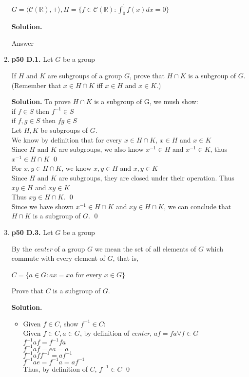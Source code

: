 \documentclass[11pt]{article}
\begin{document}
\begin{enumerate}
  $G = \langle \mathscr{C}(\mathbb{R}),+\rangle, H = \{f \in \mathscr{C}(\mathbb{R}) : \int_{0}^{1} f(x) dx = 0\}$
  
  {\bfseries Solution.}
  
  Answer \\
 
\newpage
 
\item {\bfseries p50 D.1.} Let $G$ be a group
  
  If $H$ and $K$ are subgroups of a group $G$, prove that $H \cap K$ is a subgroup of $G$. (Remember that $x \in H \cap K$ iff $x \in H$ and $x \in K$.)
  
  {\bfseries Solution.} To prove $H \cap K$ is a subgroup of G, we mush show: \\
  if $f \in S$ then $f^{-1} \in S$ \\
  if $f,g \in S$ then $fg \in S$ \\
  
  Let $H, K$ be subgroups of $G$. \\
  We know by definition that for every $x \in H \cap K$, $x \in H$ and $x \in K$ \\
  Since $H$ and $K$ are subgroups, we also know $x^{-1} \in H$ and $x^{-1} \in K$, thus $x^{-1} \in H \cap K$ \qed \\
  
  For $x,y \in H \cap K$, we know $x,y \in H$ and $x,y \in K$ \\
  Since $H$ and $K$ are subgroups, they are closed under their operation. Thus $xy \in H$ and $xy \in K$ \\
  Thus $xy \in H \cap K$. \qed \\
  
  Since we have shown $x^{-1} \in H \cap K$ and $xy \in H \cap K$, we can conclude that $H \cap K$ is a subgroup of $G$. \qed \\

\item {\bfseries p50 D.3.} Let $G$ be a group
  
  By the \textit{center} of a group $G$ we mean the set of all elements of $G$ which commute with every element of $G$, that is,
  
  $C = \{ a \in G : ax = xa$ for every $x \in G\}$
  
  Prove that $C$ is a subgroup of $G$.
  
  {\bfseries Solution.}
  
  \begin{itemize}
	  \item Given $f \in C$, show $f^{-1} \in C$: \\
	  Given $f \in C, a \in G$, by definition of \textit{center}, $af = fa \forall f \in G$ \\
	  $f^{-1}af = f^{-1}fa$ \\
	  $f^{-1}af = ea = a$ \\
	  $f^{-1}aff^{-1} = af^{-1}$ \\
	  $f^{-1}ae = f^{-1}a = af^{-1}$ \\
	  Thus, by definition of $C$, $f^{-1} \in C$ \qed \\
	  

\end{itemize}
\end{enumerate}
\end{document}
